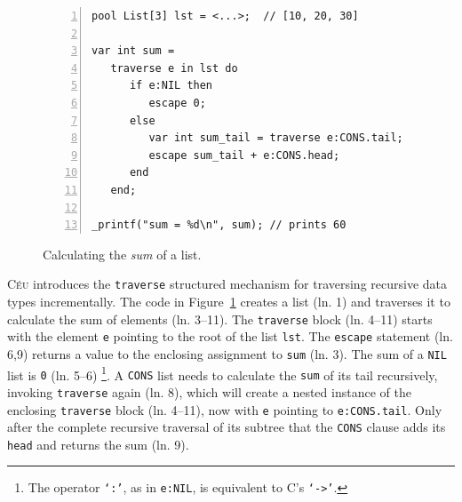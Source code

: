 \documentclass{sig-alternate}
\newcommand{\CEU}{\textsc{C\'{e}u}\xspace}
\newcommand{\code}[1] {{\small{\texttt{#1}}}}
\begin{document}
\begin{figure}[t]
\begin{lstlisting}[numbers=left,xleftmargin=3em]
pool List[3] lst = <...>;  // [10, 20, 30]

var int sum =
   traverse e in lst do
      if e:NIL then
         escape 0;
      else
         var int sum_tail = traverse e:CONS.tail;
         escape sum_tail + e:CONS.head;
      end
   end;

_printf("sum = %d\n", sum); // prints 60
\end{lstlisting}
\caption{
Calculating the \emph{sum} of a list.
\label{lst.list.sum}
}
\end{figure}

\CEU introduces the \code{traverse} structured mechanism for traversing 
recursive data types incrementally.
%
The code in Figure~\ref{lst.list.sum} creates a list (ln. 1) and traverses it 
to calculate the sum of elements (ln. 3--11).
The \code{traverse} block (ln. 4--11) starts with the element \code{e} 
pointing to the root of the list \code{lst}.
The \code{escape} statement (ln. 6,9) returns a value to the enclosing 
assignment to \code{sum} (ln. 3).
The sum of a \code{NIL} list is \code{0} (ln. 5--6)%
\footnote{
The operator \code{`:'}, as in \code{e:NIL}, is equivalent to C's \code{`->'}.
}.
A \code{CONS} list needs to calculate the \code{sum} of its tail recursively, 
invoking \code{traverse} again (ln. 8), which will create a nested instance of 
the enclosing \code{traverse} block (ln. 4--11), now with \code{e} pointing to 
\code{e:CONS.tail}.
Only after the complete recursive traversal of its subtree that the \code{CONS} 
clause adds its \code{head} and returns the sum (ln. 9).
\end{document}
